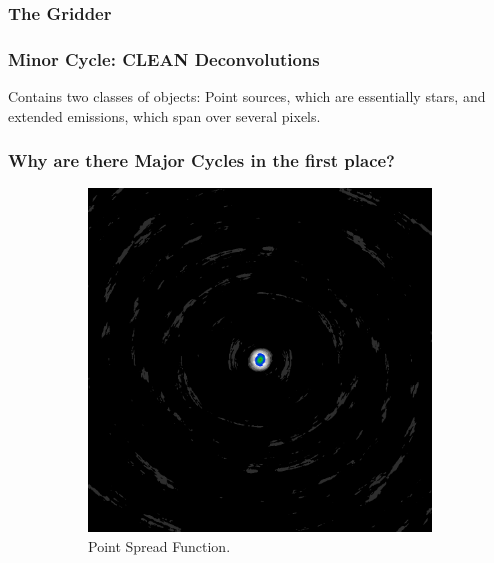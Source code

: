 \subsubsection{The Gridder}


\subsubsection{Minor Cycle: CLEAN Deconvolutions}
Contains two classes of objects: Point sources, which are essentially stars, and extended emissions, which span over several pixels.


\subsubsection{Why are there Major Cycles in the first place?}
\begin{figure}[h]
	\centering
	\begin{subfigure}[b]{0.3\linewidth}
		\includegraphics[width=\linewidth]{./chapters/01.intro/mk2/psf.png}
		\caption{Point Spread Function.}
		\label{results:points:tclean}
	\end{subfigure}
	\begin{subfigure}[b]{0.3\linewidth}

\end{subfigure}
\end{figure}
